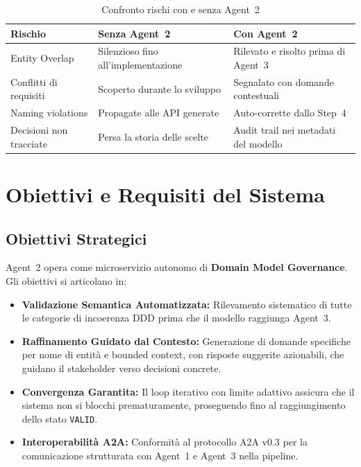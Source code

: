 \documentclass[12pt,a4paper]{report}
\begin{document}
\begin{table}[H]
\centering
\renewcommand{\arraystretch}{1.3}
\begin{tabularx}{\textwidth}{>{\raggedright\arraybackslash}l >{\raggedright\arraybackslash}X >{\raggedright\arraybackslash}X}
\toprule
\textbf{Rischio} & \textbf{Senza Agent~2} & \textbf{Con Agent~2} \\
\midrule
Entity Overlap & Silenzioso fino all'implementazione & Rilevato e risolto prima di Agent~3 \\
Conflitti di requisiti & Scoperto durante lo sviluppo & Segnalato con domande contestuali \\
Naming violations & Propagate alle API generate & Auto-corrette dallo Step~4 \\
Decisioni non tracciate & Persa la storia delle scelte & Audit trail nei metadati del modello \\
\bottomrule
\end{tabularx}
\caption{Confronto rischi con e senza Agent~2}
\label{tab:risk-comparison}
\end{table}

\chapter{Obiettivi e Requisiti del Sistema}

\section{Obiettivi Strategici}

Agent~2 opera come microservizio autonomo di \textbf{Domain Model Governance}.
Gli obiettivi si articolano in:

\begin{itemize}
  \item \textbf{Validazione Semantica Automatizzata:} Rilevamento sistematico di tutte le
        categorie di incoerenza DDD prima che il modello raggiunga Agent~3.

  \item \textbf{Raffinamento Guidato dal Contesto:} Generazione di domande specifiche per
        nome di entità e bounded context, con risposte suggerite azionabili,
        che guidano il stakeholder verso decisioni concrete.

  \item \textbf{Convergenza Garantita:} Il loop iterativo con limite adattivo assicura
        che il sistema non si blocchi prematuramente, proseguendo fino al raggiungimento
        dello stato \texttt{VALID}.

  \item \textbf{Interoperabilità A2A:} Conformità al protocollo A2A v0.3 per la
        comunicazione strutturata con Agent~1 e Agent~3 nella pipeline.
\end{itemize}
\end{document}
